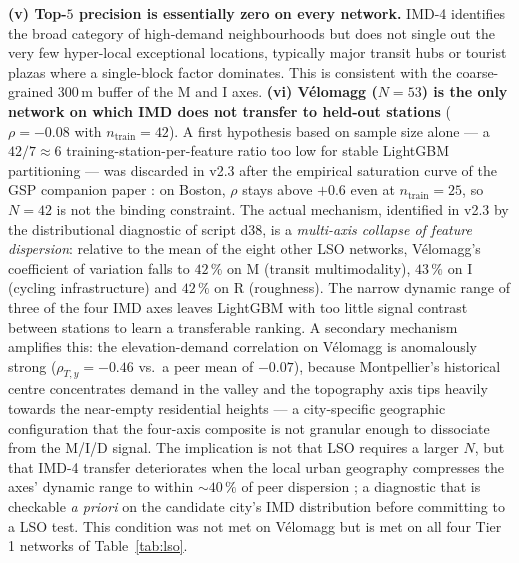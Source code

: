 \documentclass[11pt,a4paper]{article}
\begin{document}
\textbf{(v) Top-$5$ precision is essentially zero on every
network.}  IMD-4 identifies the broad category of high-demand
neighbourhoods but does not single out the very few hyper-local
exceptional locations, typically major transit hubs or tourist
plazas where a single-block factor dominates.  This is consistent
with the coarse-grained $300$\,m buffer of the M and I axes.
\textbf{(vi) V\'elomagg ($N = 53$) is the only network on which
IMD does not transfer to held-out stations} ($\rho = -0.08$ with
$n_{\mathrm{train}} = 42$).  A first hypothesis based on sample
size alone — a $42/7 \approx 6$ training-station-per-feature
ratio too low for stable LightGBM partitioning — was discarded
in v2.3 after the empirical saturation curve of the GSP
companion paper \citep{FossePallares2026gsp} : on Boston, $\rho$ stays above
$+0.6$ even at $n_{\mathrm{train}} = 25$, so $N = 42$ is not
the binding constraint.  The actual mechanism, identified in
v2.3 by the distributional diagnostic of script d38, is a
\emph{multi-axis collapse of feature dispersion}: relative to
the mean of the eight other LSO networks, V\'elomagg's
coefficient of variation falls to $42\,\%$ on M (transit
multimodality), $43\,\%$ on I (cycling infrastructure) and
$42\,\%$ on R (roughness).  The narrow dynamic range of three
of the four IMD axes leaves LightGBM with too little signal
contrast between stations to learn a transferable ranking.
A secondary mechanism amplifies this: the elevation-demand
correlation on V\'elomagg is anomalously strong
($\rho_{T, y} = -0.46$ vs.\ a peer mean of $-0.07$),
because Montpellier's historical centre concentrates demand in
the valley and the topography axis tips heavily towards the
near-empty residential heights — a city-specific geographic
configuration that the four-axis composite is not granular
enough to dissociate from the M/I/D signal.  The implication is
not that LSO requires a larger $N$, but that IMD-4 transfer
deteriorates when the local urban geography compresses the
axes' dynamic range to within $\sim 40\,\%$ of peer dispersion ;
a diagnostic that is checkable \emph{a priori} on the candidate
city's IMD distribution before committing to a LSO test.  This
condition was not met on V\'elomagg but is met on all four
Tier 1 networks of Table~\ref{tab:lso}.
\end{document}
